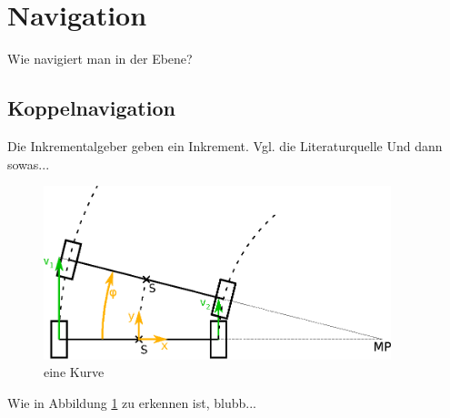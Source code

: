 \section{Navigation}

Wie navigiert man in der Ebene?

\subsection{Koppelnavigation}

Die Inkrementalgeber geben ein Inkrement. Vgl. die Literaturquelle \cite{wikiMiller}
Und dann sowas...

\begin{figure}[h]
\centering\includegraphics[width=0.9\textwidth]{images/Kurvenkinematic.eps}
\caption[eine Kurve im Abbildungsverzeichnis]{eine Kurve \cite{kurvenkinematikQuelle}}
\label{kurvenkinematik}
\end{figure}

Wie in Abbildung \ref{kurvenkinematik} zu erkennen ist, blubb...
